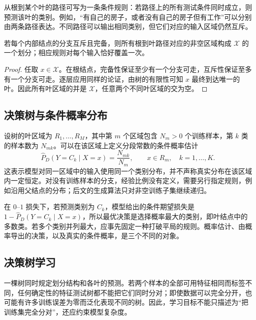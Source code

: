 从根到某个叶的路径可写为一条条件规则：若路径上的所有测试条件同时成立，则预测该叶的类别。例如，“有自己的房子，或者没有自己的房子但有工作”可以分别由两条路径表达。不同路径可以输出相同类别，但它们对应的输入区域仍然互斥。

\begin{proposition}
\label{prop:lihang-tree-partition}
若每个内部结点的分支互斥且完备，则所有根到叶路径对应的非空区域构成 $\mathcal X$ 的一个划分；相应规则对每个输入恰好覆盖一次。
\end{proposition}
\begin{proof}
任取 $x\in\mathcal X$。在根结点，完备性保证至少有一个分支可走，互斥性保证至多有一个分支可走。逐层应用同样的论证，由树的有限性可知 $x$ 最终到达唯一的叶。因此所有叶区域的并是 $\mathcal X$，任意两个不同叶区域的交为空。\qedhere
\end{proof}

\subsection{决策树与条件概率分布}

设树的叶区域为 $R_1,\ldots,R_M$，其中第 $m$ 个区域包含 $N_m>0$ 个训练样本，第 $k$ 类的样本数为 $N_{mk}$。可以在该区域上定义分段常数的条件概率估计
\begin{equation}
  \widehat P_D(Y=C_k\mid X=x)=\frac{N_{mk}}{N_m},
  \qquad x\in R_m,\quad k=1,\ldots,K.
  \label{eq:lihang-tree-probability}
\end{equation}
这表示模型对同一区域中的输入使用同一个类别分布，并不声称真实分布在该区域内一定恒定。对没有训练样本的分支，经验比例没有定义，需要另行指定规则，例如沿用父结点的分布；后文的生成算法只对非空训练子集继续递归。

在 $0$--$1$ 损失下，若预测类别为 $C_k$，模型给出的条件期望损失是 $1-\widehat P_D(Y=C_k\mid X=x)$，所以最优决策是选择概率最大的类别，即叶结点中的多数类。若多个类别并列最大，应事先固定一种打破平局的规则。概率估计、由概率导出的决策，以及真实的条件概率，是三个不同的对象。

\subsection{决策树学习}

一棵树同时规定划分结构和各叶的预测。若两个样本的全部可用特征相同而标签不同，任何确定性的特征测试树都不能把它们同时分对；即使数据可以完全分开，也可能有许多训练误差为零而泛化表现不同的树。因此，学习目标不能只描述为“把训练集完全分对”，还应约束模型复杂度。

